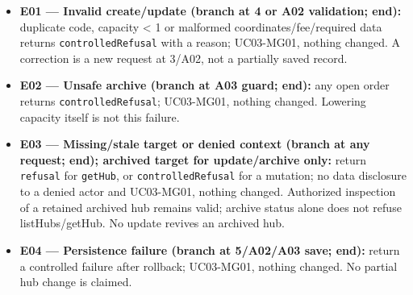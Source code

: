 \begin{itemize}
\item \textbf{E01 --- Invalid create/update (branch at 4 or A02 validation; end):} duplicate code, capacity \textless{} 1 or malformed coordinates/fee/required data returns \texttt{controlledRefusal} with a reason; UC03-MG01, nothing changed. A correction is a new request at 3/A02, not a partially saved record.

\item \textbf{E02 --- Unsafe archive (branch at A03 guard; end):} any open order returns \texttt{controlledRefusal}; UC03-MG01, nothing changed. Lowering capacity itself is not this failure.

\item \textbf{E03 --- Missing/stale target or denied context (branch at any request; end); archived target for update/archive only:} return \texttt{refusal} for \texttt{getHub}, or \texttt{controlledRefusal} for a mutation; no data disclosure to a denied actor and UC03-MG01, nothing changed. Authorized inspection of a retained archived hub remains valid; archive status alone does not refuse listHubs/getHub. No update revives an archived hub.

\item \textbf{E04 --- Persistence failure (branch at 5/A02/A03 save; end):} return a controlled failure after rollback; UC03-MG01, nothing changed. No partial hub change is claimed.

\end{itemize}
